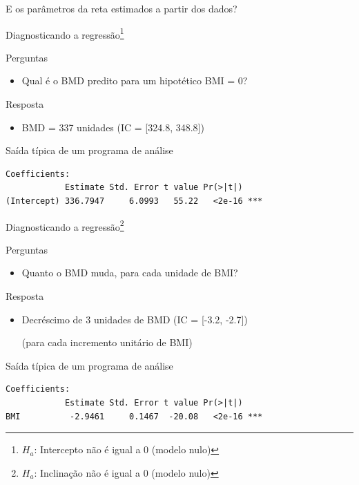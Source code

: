 \documentclass{beamer}
\begin{document}
\begin{frame}{\scriptsize }
  \begin{center}
    E os parâmetros da reta estimados a partir dos dados?
  \end{center}
\end{frame}

\begin{frame}[fragile]{\scriptsize Diagnosticando a regressão\footnote{\scriptsize $H_a$: Intercepto não é igual a 0 (modelo nulo)}}
  \begin{block}{Perguntas}
    \footnotesize
    \begin{itemize}
      \footnotesize
    \item Qual é o BMD predito para um hipotético BMI = 0?
    \end{itemize}
  \end{block}
  \bigskip
  \begin{exampleblock}{Resposta}
    \begin{itemize}
    \item BMD = 337 unidades \footnotesize (IC = [324.8, 348.8])
    \end{itemize}
  \end{exampleblock}
  \vfill
  \begin{exampleblock}{Saída típica de um programa de análise}
    \scriptsize
\begin{verbatim}
Coefficients:
            Estimate Std. Error t value Pr(>|t|)    
(Intercept) 336.7947     6.0993   55.22   <2e-16 ***
\end{verbatim}
\end{exampleblock}
\end{frame}

\begin{frame}[fragile]{\scriptsize Diagnosticando a regressão\footnote{\scriptsize $H_a$: Inclinação não é igual a 0 (modelo nulo)}}
  \begin{block}{Perguntas}
    \footnotesize
    \begin{itemize}
      \footnotesize
    \item Quanto o BMD muda, para cada unidade de BMI?
    \end{itemize}
  \end{block}
  \bigskip
    \begin{exampleblock}{Resposta}
      \begin{itemize}
      \item Decréscimo de 3 unidades de BMD \footnotesize (IC = [-3.2, -2.7])

        \bigskip
        \scriptsize (para cada incremento unitário de BMI)
    \end{itemize}
  \end{exampleblock}
  \vfill
  \begin{exampleblock}{Saída típica de um programa de análise}
    \scriptsize
\begin{verbatim}
Coefficients:
            Estimate Std. Error t value Pr(>|t|)    
BMI          -2.9461     0.1467  -20.08   <2e-16 ***
\end{verbatim}
\end{exampleblock}
\end{frame}
\end{document}
